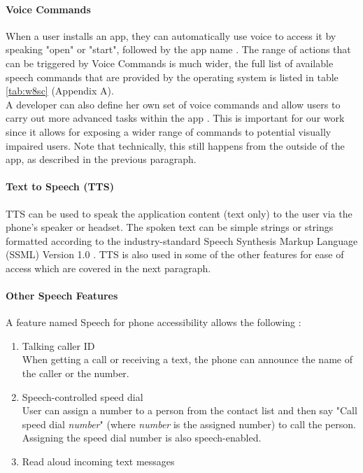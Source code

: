\paragraph{Voice Commands}
When a user installs an app, they can automatically use voice to access it by speaking "open" or "start", followed by the app name \cite{wp8voice}. The range of actions that can be triggered by Voice Commands is much wider, the full list of available speech commands that are provided by the operating system is listed in table \ref{tab:w8sc} (Appendix A).\\
A developer can also define her own set of voice commands and allow users to carry out more advanced tasks within the app \cite{wp8voice}. This is important for our work since it allows for exposing a wider range of commands to potential visually impaired users. Note that technically, this still happens from the outside of the app, as described in the previous paragraph.

\paragraph{Text to Speech (TTS)}
TTS can be used to speak the application content (text only) to the user via the phone's speaker or headset. The spoken text can be simple strings or strings formatted according to the industry-standard Speech Synthesis Markup Language (SSML) Version 1.0 \cite{phone8speech}. TTS is also used in some of the other features for ease of access which are covered in the next paragraph.

\paragraph{Other Speech Features}
A feature named Speech for phone accessibility allows the following \cite{wp8voice}:
\begin{enumerate}
\item Talking caller ID\\
When getting a call or receiving a text, the phone can announce the name of the caller or the number.
\item Speech-controlled speed dial\\
User can assign a number to a person from the contact list and then say "Call speed dial \emph{number}" (where \emph{number} is the assigned number) to call the person. Assigning the speed dial number is also speech-enabled.
\item Read aloud incoming text messages
\end{enumerate}


